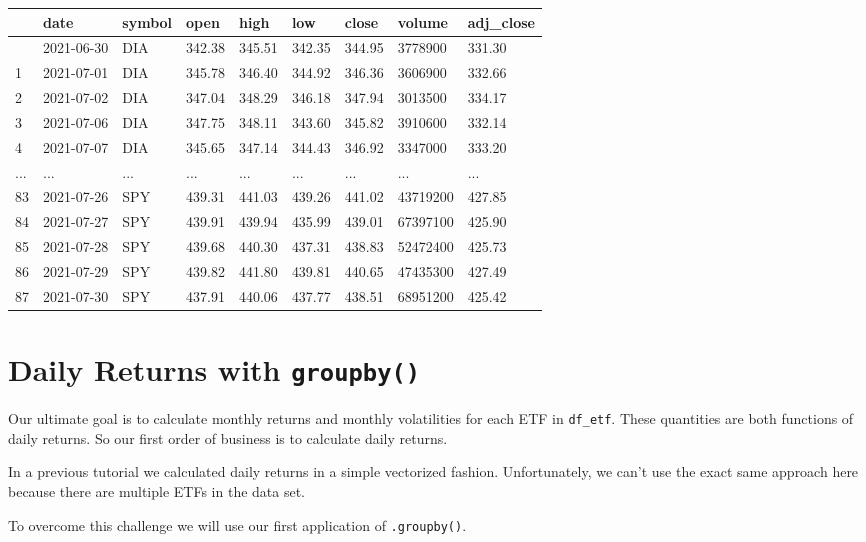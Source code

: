 \documentclass[
  letterpaper,
  DIV=11,
  numbers=noendperiod]{scrreprt}
\begin{document}
\begin{longtable}[]{@{}lllllllll@{}}
\toprule\noalign{}
& date & symbol & open & high & low & close & volume & adj\_close \\
\midrule\noalign{}
\endhead
\bottomrule\noalign{}
\endlastfoot
0 & 2021-06-30 & DIA & 342.38 & 345.51 & 342.35 & 344.95 & 3778900 &
331.30 \\
1 & 2021-07-01 & DIA & 345.78 & 346.40 & 344.92 & 346.36 & 3606900 &
332.66 \\
2 & 2021-07-02 & DIA & 347.04 & 348.29 & 346.18 & 347.94 & 3013500 &
334.17 \\
3 & 2021-07-06 & DIA & 347.75 & 348.11 & 343.60 & 345.82 & 3910600 &
332.14 \\
4 & 2021-07-07 & DIA & 345.65 & 347.14 & 344.43 & 346.92 & 3347000 &
333.20 \\
... & ... & ... & ... & ... & ... & ... & ... & ... \\
83 & 2021-07-26 & SPY & 439.31 & 441.03 & 439.26 & 441.02 & 43719200 &
427.85 \\
84 & 2021-07-27 & SPY & 439.91 & 439.94 & 435.99 & 439.01 & 67397100 &
425.90 \\
85 & 2021-07-28 & SPY & 439.68 & 440.30 & 437.31 & 438.83 & 52472400 &
425.73 \\
86 & 2021-07-29 & SPY & 439.82 & 441.80 & 439.81 & 440.65 & 47435300 &
427.49 \\
87 & 2021-07-30 & SPY & 437.91 & 440.06 & 437.77 & 438.51 & 68951200 &
425.42 \\
\end{longtable}

\hypertarget{daily-returns-with-groupby}{%
\section{\texorpdfstring{Daily Returns with
\texttt{groupby()}}{Daily Returns with groupby()}}\label{daily-returns-with-groupby}}

Our ultimate goal is to calculate monthly returns and monthly
volatilities for each ETF in \texttt{df\_etf}. These quantities are both
functions of daily returns. So our first order of business is to
calculate daily returns.

In a previous tutorial we calculated daily returns in a simple
vectorized fashion. Unfortunately, we can't use the exact same approach
here because there are multiple ETFs in the data set.

To overcome this challenge we will use our first application of
\texttt{.groupby()}.
\end{document}
